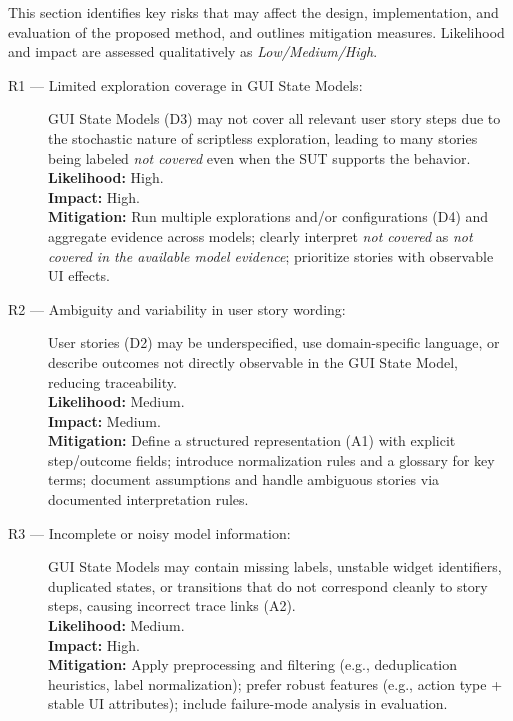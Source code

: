 \documentclass{ou-report-vaf}
\begin{document}
This section identifies key risks that may affect the design, implementation, and evaluation of the proposed method, and outlines mitigation measures. Likelihood and impact are assessed qualitatively as \emph{Low/Medium/High}.

\begin{description}
    \item[R1 --- Limited exploration coverage in GUI State Models:]
    GUI State Models (D3) may not cover all relevant user story steps due to the stochastic nature of scriptless exploration, leading to many stories being labeled \emph{not covered} even when the SUT supports the behavior. \\
    \textbf{Likelihood:} High. \\
    \textbf{Impact:} High. \\
    \textbf{Mitigation:} Run multiple explorations and/or configurations (D4) and aggregate evidence across models; clearly interpret \emph{not covered} as \emph{not covered in the available model evidence}; prioritize stories with observable UI effects.

    \item[R2 --- Ambiguity and variability in user story wording:]
    User stories (D2) may be underspecified, use domain-specific language, or describe outcomes not directly observable in the GUI State Model, reducing traceability. \\
    \textbf{Likelihood:} Medium. \\
    \textbf{Impact:} Medium. \\
    \textbf{Mitigation:} Define a structured representation (A1) with explicit step/outcome fields; introduce normalization rules and a glossary for key terms; document assumptions and handle ambiguous stories via documented interpretation rules.

    \item[R3 --- Incomplete or noisy model information:]
    GUI State Models may contain missing labels, unstable widget identifiers, duplicated states, or transitions that do not correspond cleanly to story steps, causing incorrect trace links (A2). \\
    \textbf{Likelihood:} Medium. \\
    \textbf{Impact:} High. \\
    \textbf{Mitigation:} Apply preprocessing and filtering (e.g., deduplication heuristics, label normalization); prefer robust features (e.g., action type + stable UI attributes); include failure-mode analysis in evaluation.


\end{description}
\end{document}
